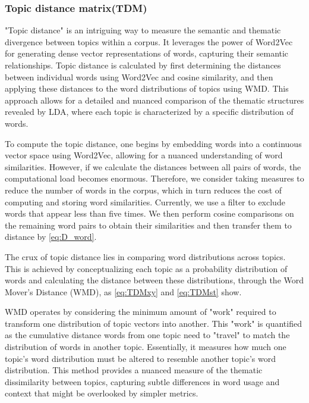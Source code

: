 \documentclass[UTF8]{ctexart}
\begin{document}
\subsubsection{Topic distance matrix(TDM)}
{
    "Topic distance" is an intriguing way to measure the semantic and thematic divergence between topics within a corpus. 
    It leverages the power of Word2Vec for generating dense vector representations of words, capturing their semantic relationships. 
    Topic distance is calculated by first determining the distances between individual words using Word2Vec and cosine similarity, 
    and then applying these distances to the word distributions of topics using WMD. 
    This approach allows for a detailed and nuanced comparison of the thematic structures revealed by LDA, 
    where each topic is characterized by a specific distribution of words.

    To compute the topic distance, one begins by embedding words into a continuous vector space using Word2Vec, 
    allowing for a nuanced understanding of word similarities. 
    However, if we calculate the distances between all pairs of words,
    the computational load becomes enormous. Therefore,
    we consider taking measures to reduce the number of words in the corpus, 
    which in turn reduces the cost of computing and storing word similarities. 
    Currently, we use a filter to exclude words that appear less than five times. 
    We then perform cosine comparisons on the remaining word pairs to obtain their similarities and then transfer them to distance by \eqref{eq:D_word}.

    The crux of topic distance lies in comparing word distributions across topics.
    This is achieved by conceptualizing each topic as a probability distribution of words and calculating the distance
    between these distributions, through the Word Mover's Distance (WMD), as \eqref{eq:TDMxy} and \eqref{eq:TDMst} show.

    WMD operates by considering the minimum amount of "work" required to transform one distribution of topic vectors into another. 
    This "work" is quantified as the cumulative distance words from one topic need to "travel" to match the distribution of words in another topic.
    Essentially, it measures how much one topic's word distribution must be altered to resemble another topic's word distribution.
    This method provides a nuanced measure of the thematic dissimilarity between topics,
    capturing subtle differences in word usage and context that might be overlooked by simpler metrics.

}
\end{document}
